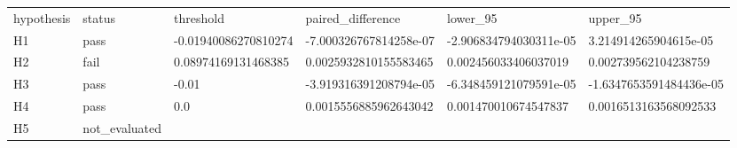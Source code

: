 \begin{tabular}{llllll}
hypothesis & status & threshold & paired\_difference & lower\_95 & upper\_95 \\
H1 & pass & -0.01940086270810274 & -7.000326767814258e-07 & -2.906834794030311e-05 & 3.214914265904615e-05 \\
H2 & fail & 0.08974169131468385 & 0.0025932810155583465 & 0.002456033406037019 & 0.002739562104238759 \\
H3 & pass & -0.01 & -3.919316391208794e-05 & -6.348459121079591e-05 & -1.6347653591484436e-05 \\
H4 & pass & 0.0 & 0.0015556885962643042 & 0.001470010674547837 & 0.0016513163568092533 \\
H5 & not\_evaluated &  &  &  &  \\
\end{tabular}
